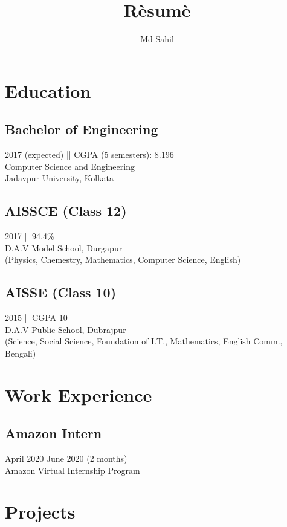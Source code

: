 \documentclass{article}
\title{R\`esum\`e}
\author{Md Sahil} \date{}
\renewcommand{\maketitle}{
\begin{center}
{\Huge\bfseries\theauthor}
\end{center}
}
\begin{document}
{\maketitle} 

\section{Education} 

\subsection{Bachelor of Engineering}
2017 (expected) || CGPA (5 semesters): 8.196\\
Computer Science and Engineering\\
Jadavpur University, Kolkata\\

\subsection{AISSCE (Class 12)}
2017 || 94.4\%\\
D.A.V Model School, Durgapur\\
(Physics, Chemestry, Mathematics, Computer Science, English)\\

\subsection{AISSE (Class 10)}
2015 || CGPA 10\\
D.A.V Public School, Dubrajpur\\
(Science, Social Science, Foundation of I.T., Mathematics, English Comm., Bengali)\\


\section{Work Experience}
\subsection{Amazon Intern}
April 2020 \- June 2020 (2 months)\\
Amazon Virtual Internship Program


\section{Projects} 
\end{document}
